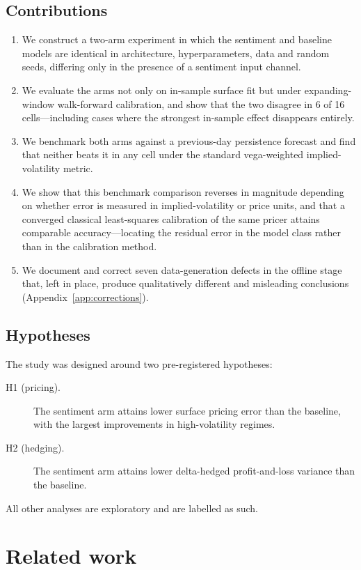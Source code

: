\documentclass[11pt,a4paper]{article}
\begin{document}
\subsection{Contributions}
\begin{enumerate}
\item We construct a two-arm experiment in which the sentiment and baseline
models are identical in architecture, hyperparameters, data and random seeds,
differing only in the presence of a sentiment input channel.
\item We evaluate the arms not only on in-sample surface fit but under
expanding-window walk-forward calibration, and show that the two disagree in 6
of 16 cells---including cases where the strongest in-sample effect disappears
entirely.
\item We benchmark both arms against a previous-day persistence forecast and
find that neither beats it in any cell under the standard vega-weighted
implied-volatility metric.
\item We show that this benchmark comparison reverses in magnitude depending on
whether error is measured in implied-volatility or price units, and that a
converged classical least-squares calibration of the same pricer attains
comparable accuracy---locating the residual error in the model class rather than
in the calibration method.
\item We document and correct seven data-generation defects in the offline stage
that, left in place, produce qualitatively different and misleading conclusions
(Appendix~\ref{app:corrections}).
\end{enumerate}

\subsection{Hypotheses}
The study was designed around two pre-registered hypotheses:
\begin{description}
\item[H1 (pricing).] The sentiment arm attains lower surface pricing error than
the baseline, with the largest improvements in high-volatility regimes.
\item[H2 (hedging).] The sentiment arm attains lower delta-hedged
profit-and-loss variance than the baseline.
\end{description}
All other analyses are exploratory and are labelled as such.

\section{Related work}
\end{document}
